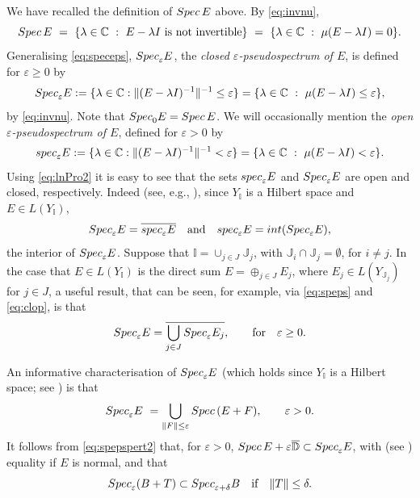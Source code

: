 \documentclass[preprint,1p,11pt]{elsarticle}
\newcommand\C{{\mathbb C}}
\newcommand\D{{\mathbb D}}
\newcommand\I{{\mathbb I}}
\newcommand\J{{\mathbb J}}
\newcommand\eps{{\varepsilon}}
\newcommand\Spec{{\rm Spec}\,}  %
\newcommand\Specn{{\rm Spec}}   %
\newcommand\speps{{\rm spec}_\eps}
\newcommand\Speps{{\rm Spec}_\eps}
\numberwithin{equation}{section}   %
\numberwithin{figure}{section}  %
\begin{document}
We have recalled the definition of $\Spec E$ above. By \eqref{eq:invnu},
\[
\Spec E\ =\ \{\lambda\in\C\ :\ E-\lambda I \mbox{ is not invertible}\}\ =\ \{\lambda\in\C\ :\ \mu(E-\lambda I)=0\}.
\]
Generalising \eqref{eq:speceps}, $\Speps E$,   the {\em closed $\eps$-pseudospectrum of $E$}, is defined for $\eps\geq 0$ by
\begin{equation} \label{eq:Speps}
\Speps E := \{\lambda\in \C: \|(E-\lambda I)^{-1}\|^{-1}\leq \eps\} =\{\lambda\in\C\ :\ \mu(E-\lambda I)\le\eps\}, 
\end{equation}
by \eqref{eq:invnu}.  Note that $\Specn_0 E = \Spec E$. We will occasionally mention the  {\sl open $\eps$-pseudospectrum of $E$}, defined for $\eps>0$ by
\begin{equation} \label{eq:speps}
\speps E := \{\lambda\in \C: \|(E-\lambda I)^{-1}\|^{-1}< \eps\} =\{\lambda\in\C\ :\ \mu(E-\lambda I)<\eps\}.
\end{equation}
Using \eqref{eq:lnPro2} it is easy to see that the sets $\speps E$ and $\Speps E$ are open and closed, respectively. Indeed (see, e.g., \cite{Shargo08}), since $Y_\I$ is a Hilbert space and $E\in L(Y_\I)$,
\begin{equation} \label{eq:clop}
\Speps E = \overline{\speps E} \quad \mbox{and} \quad \speps E = {\rm int}(\Speps E),
\end{equation}
the interior of $\Speps E$. Suppose that $\I=\cup_{j\in J}\J_j$, with $\J_i\cap \J_j=\emptyset$, for $i\neq j$. In the case that $E\in L(Y_\I)$ is the direct sum $E=\oplus_{j\in J} E_j$, where $E_j\in L(Y_{\J_j})$ for $j\in J$,  a useful result, that can be seen, for example, via \eqref{eq:speps} and \eqref{eq:clop}, is that 
\begin{equation} \label{eq:ds2}
\Speps E = \overline{\bigcup_{j\in J} \Speps E_j}, \qquad \mbox{for} \quad \eps\geq 0.
\end{equation}

An informative characterisation of $\Speps E$ (which holds since $Y_\I$ is a Hilbert space; see \cite[Theorem 3.27]{HaRoSi2}) %
is that
\begin{equation} \label{eq:spepspert2}
\Speps E\ = \bigcup_{\|F\|\leq\eps} \Spec (E+F), \qquad \eps>0.
\end{equation}
It follows from \eqref{eq:spepspert2} that, for $\eps>0$,
$\Spec E + \eps \overline{\D}\subset \Speps E$, with  (see \cite[p.~247]{Davies2007:Book}) equality if $E$ is normal,
and that
\begin{equation} \label{eq:PseudInc2}
\Speps(B+T) \subset \Specn_{\eps+\delta} B \quad \mbox{if} \quad \|T\|\leq \delta.
\end{equation}
\end{document}
